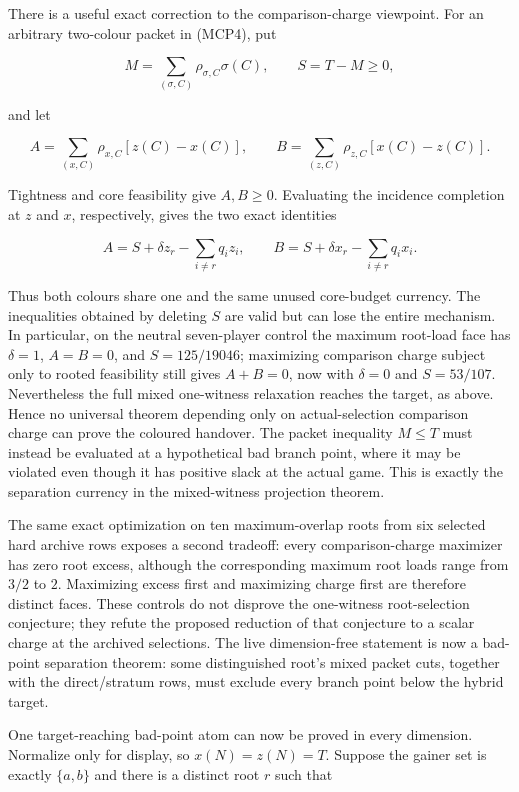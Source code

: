 \documentclass[11pt]{article}
\begin{document}
There is a useful exact correction to the comparison-charge viewpoint.
For an arbitrary two-colour packet in (MCP4), put

\[
 M=\sum_{(\sigma,C)}\rho_{\sigma,C}\sigma(C),\qquad
 S=T-M\geq0,
\]

and let

\[
 A=\sum_{(x,C)}\rho_{x,C}[z(C)-x(C)],\qquad
 B=\sum_{(z,C)}\rho_{z,C}[x(C)-z(C)].
\]

Tightness and core feasibility give $A,B\geq0$.  Evaluating the incidence
completion at $z$ and $x$, respectively, gives the two exact identities

\[
 \boxed{\quad
 A=S+\delta z_r-\sum_{i\ne r}q_i z_i,
 \qquad
 B=S+\delta x_r-\sum_{i\ne r}q_i x_i .\quad}        \tag{PXC52}
\]

Thus both colours share one and the same unused core-budget currency.  The
inequalities obtained by deleting $S$ are valid but can lose the entire
mechanism.  In particular, on the neutral seven-player control the maximum
root-load face has $\delta=1$, $A=B=0$, and
$S=125/19046$; maximizing comparison charge subject only to rooted
feasibility still gives $A+B=0$, now with $\delta=0$ and $S=53/107$.
Nevertheless the full mixed one-witness relaxation reaches the target, as
above.  Hence no universal theorem depending only on actual-selection
comparison charge can prove the coloured handover.  The packet inequality
$M\leq T$ must instead be evaluated at a hypothetical bad branch point,
where it may be violated even though it has positive slack at the actual
game.  This is exactly the separation currency in the mixed-witness
projection theorem.

The same exact optimization on ten maximum-overlap roots from six selected
hard archive rows exposes a second tradeoff: every comparison-charge
maximizer has zero root excess, although the corresponding maximum root loads
range from $3/2$ to $2$.  Maximizing excess first and maximizing charge first
are therefore distinct faces.  These controls do not disprove the
one-witness root-selection conjecture; they refute the proposed reduction of
that conjecture to a scalar charge at the archived selections.  The live
dimension-free statement is now a bad-point separation theorem: some
distinguished root's mixed packet cuts, together with the direct/stratum
rows, must exclude every branch point below the hybrid target.

One target-reaching bad-point atom can now be proved in every dimension.
Normalize only for display, so $x(N)=z(N)=T$.  Suppose the gainer set is
exactly $\{a,b\}$ and there is a distinct root $r$ such that
\end{document}
